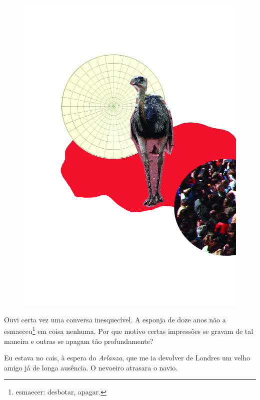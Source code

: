 \pagebreak
\thispagestyle{empty}
\begin{figure}
\vspace*{-.5cm}
\hspace*{-2.3cm}\includegraphics[width=140mm]{../ilustracoes/08_PEQUENINOS.jpg}
\end{figure}
\pagebreak


\noindent{}Ouvi certa vez uma conversa inesquecível. A esponja de doze anos não a
esmaeceu\footnote{esmaecer: desbotar, apagar.} em coisa nenhuma. Por que
motivo certas impressões se gravam de tal maneira e outras se apagam tão
profundamente?

Eu estava no cais, à espera do \emph{Arlanza}, que me ia devolver de
Londres um velho amigo já de longa ausência. O nevoeiro atrasara o
navio.

